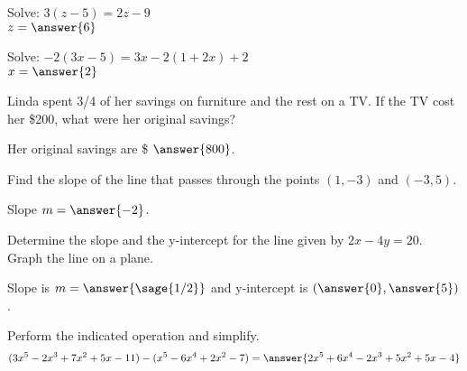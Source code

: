 \documentclass{ximera}
\begin{document}
\begin{problem}
Solve: \hspace{1cm} $3(z-5) = 2z-9$\\

$z=\answer{6}$



\end{problem}



\begin{problem}
Solve: \hspace{1 cm}$ -2(3x-5) = 3x - 2(1 + 2x) + 2$ \\

$x=\answer{2}$

\end{problem}



\begin{problem}
Linda spent 3/4 of her savings on furniture and the rest on a TV. If the TV cost her \$200, what were her original savings? 

Her original savings are \$ $\answer{800}$.



\end{problem}



\begin{problem}
Find the slope of the line that passes through the points $(1,-3)$ and $(-3,5)$.

Slope $m=\answer{-2}$.




\end{problem}



\begin{problem}
Determine the slope and the y-intercept for the line given by $2x - 4y = 20$. Graph the line on a plane.

Slope is $m=\answer{\sage{1/2}}$ and y-intercept is $(\answer{0},\answer{5})$.


\end{problem}



\begin{problem}
Perform the indicated operation and simplify.
$$(3x^5 - 2x^3 +7x^2+5x -11) - (x^5 - 6x^4 + 2x^2 -7)
=
\answer{2x^5+6x^4-2x^3+5x^2+5x-4}
$$




\end{problem}
\end{document}

